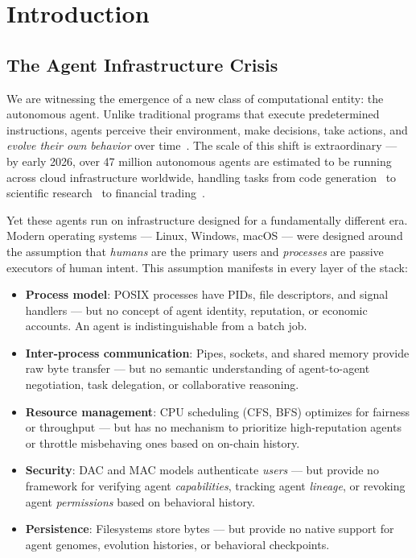 \documentclass{article}
\begin{document}
%
%

\section{Introduction}
\label{sec:introduction}

\subsection{The Agent Infrastructure Crisis}

We are witnessing the emergence of a new class of computational entity: the autonomous agent. Unlike traditional programs that execute predetermined instructions, agents perceive their environment, make decisions, take actions, and \emph{evolve their own behavior} over time~\cite{wang2024survey, xi2023rise}. The scale of this shift is extraordinary — by early 2026, over 47 million autonomous agents are estimated to be running across cloud infrastructure worldwide, handling tasks from code generation~\cite{chen2021codex, li2023starcoder} to scientific research~\cite{boiko2023emergent} to financial trading~\cite{li2023tradinggpt}.

Yet these agents run on infrastructure designed for a fundamentally different era. Modern operating systems — Linux, Windows, macOS — were designed around the assumption that \emph{humans} are the primary users and \emph{processes} are passive executors of human intent. This assumption manifests in every layer of the stack:

\begin{itemize}[leftmargin=*]
    \item \textbf{Process model}: POSIX processes have PIDs, file descriptors, and signal handlers — but no concept of agent identity, reputation, or economic accounts. An agent is indistinguishable from a batch job.
    \item \textbf{Inter-process communication}: Pipes, sockets, and shared memory provide raw byte transfer — but no semantic understanding of agent-to-agent negotiation, task delegation, or collaborative reasoning.
    \item \textbf{Resource management}: CPU scheduling (CFS, BFS) optimizes for fairness or throughput — but has no mechanism to prioritize high-reputation agents or throttle misbehaving ones based on on-chain history.
    \item \textbf{Security}: DAC and MAC models authenticate \emph{users} — but provide no framework for verifying agent \emph{capabilities}, tracking agent \emph{lineage}, or revoking agent \emph{permissions} based on behavioral history.
    \item \textbf{Persistence}: Filesystems store bytes — but provide no native support for agent genomes, evolution histories, or behavioral checkpoints.
\end{itemize}
\end{document}
